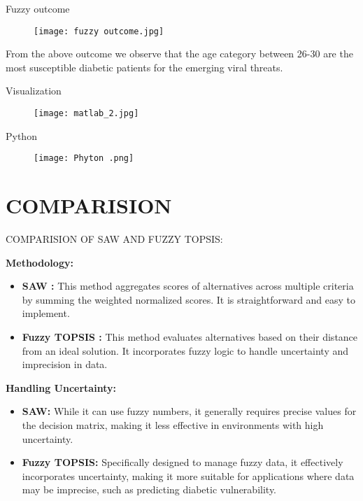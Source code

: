 \documentclass[serif, aspectratio=169]{beamer}
\newtheorem{thm co}{Theorem contd...}
\begin{document}
\begin{frame}{Fuzzy outcome}
\begin{figure}
    \centering
    \texttt{[image: fuzzy outcome.jpg]}
\end{figure}
    \hspace{1em}From the above outcome we observe that the age category between 26-30 are the most susceptible diabetic patients for the emerging viral threats.
\end{frame}
\begin{frame}{Visualization 
}
\begin{figure}
    \centering
    \texttt{[image: matlab\_2.jpg]}
\end{figure}
    
\end{frame}


\begin{frame}{Python}
    \begin{figure}
        \centering
        \texttt{[image: Phyton .png]}
    \end{figure}
\end{frame}

\section{COMPARISION}
\begin{frame}{COMPARISION OF SAW AND FUZZY TOPSIS:}
    
\textbf{Methodology:}
    \begin{itemize}
        \item \textbf{SAW :} This method aggregates scores of alternatives across multiple criteria by summing the weighted normalized scores. It is straightforward and easy to implement.

        \item \textbf{Fuzzy TOPSIS :} This method evaluates alternatives based on their distance from an ideal solution. It incorporates fuzzy logic to handle uncertainty and imprecision in data.
        \end{itemize}
\textbf{Handling Uncertainty:}
    \begin{itemize}
  
         \item \textbf{SAW: } While it can use fuzzy numbers, it generally requires precise values for the decision matrix, making it less effective in environments with high uncertainty.

        \item \textbf{Fuzzy TOPSIS: } Specifically designed to manage fuzzy data, it effectively incorporates uncertainty, making it more suitable for applications where data may be imprecise, such as predicting diabetic vulnerability.  
        
    \end{itemize}
\end{frame}
\end{document}
